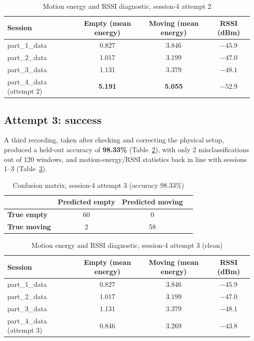 \documentclass[11pt,a4paper]{article}
\begin{document}
\begin{table}[h]
\centering
\begin{tabular}{lccc}
\toprule
\textbf{Session} & \textbf{Empty (mean energy)} & \textbf{Moving (mean energy)} & \textbf{RSSI (dBm)} \\
\midrule
part\_1\_data & 0.827 & 3.846 & $-45.9$ \\
part\_2\_data & 1.017 & 3.199 & $-47.0$ \\
part\_3\_data & 1.131 & 3.379 & $-48.1$ \\
part\_4\_data (attempt 2) & \textbf{5.191} & \textbf{5.055} & \textbf{$-52.9$} \\
\bottomrule
\end{tabular}
\caption{Motion energy and RSSI diagnostic, session-4 attempt 2}
\label{tab:diag2}
\end{table}

\subsection{Attempt 3: success}

A third recording, taken after checking and correcting the physical
setup, produced a held-out accuracy of \textbf{98.33\%}
(Table~\ref{tab:holdout3}), with only 2 misclassifications out of 120
windows, and motion-energy/RSSI statistics back in line with sessions
1--3 (Table~\ref{tab:diag3}).

\begin{table}[h]
\centering
\begin{tabular}{lccc}
\toprule
 & \textbf{Predicted empty} & \textbf{Predicted moving} \\
\midrule
\textbf{True empty}  & 60 & 0 \\
\textbf{True moving} & 2  & 58 \\
\bottomrule
\end{tabular}
\caption{Confusion matrix, session-4 attempt 3 (accuracy 98.33\%)}
\label{tab:holdout3}
\end{table}

\begin{table}[h]
\centering
\begin{tabular}{lccc}
\toprule
\textbf{Session} & \textbf{Empty (mean energy)} & \textbf{Moving (mean energy)} & \textbf{RSSI (dBm)} \\
\midrule
part\_1\_data & 0.827 & 3.846 & $-45.9$ \\
part\_2\_data & 1.017 & 3.199 & $-47.0$ \\
part\_3\_data & 1.131 & 3.379 & $-48.1$ \\
part\_4\_data (attempt 3) & 0.846 & 3.269 & $-43.8$ \\
\bottomrule
\end{tabular}
\caption{Motion energy and RSSI diagnostic, session-4 attempt 3 (clean)}
\label{tab:diag3}
\end{table}
\end{document}
